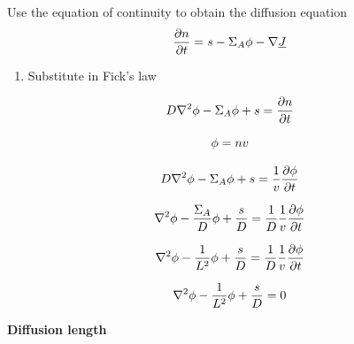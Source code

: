 \documentclass[aspectratio=1610,pdftex,dvipsnames,compress,xcolor={dvipsnames}]{beamer}
\begin{document}
\addtocounter{framenumber}{-3} 
\begin{frame}{Use the equation of continuity to obtain the diffusion equation}
    \begin{equation}
        \small
        \frac{\partial{n}}{\partial{t}} = s - \Sigma_A \phi - \nabla \underline{J}
    \end{equation}

    \begin{enumerate}[series=outerlist,topsep=0pt,itemsep=21pt,leftmargin=*,label=(\arabic*)]
        \item[]Substitute in Fick's law
    \end{enumerate}

    \vspace*{\fill}

    \begin{equation}
        \small
        D \nabla^2 \phi - \Sigma_A \phi + s = \frac{\partial{n}}{\partial{t}}
    \end{equation}

    \vspace*{\fill}

    \begin{equation}
        \small
        \phi = nv
    \end{equation}

    \begin{equation}
        \small
        D \nabla^2 \phi - \Sigma_A \phi + s = \frac{1}{v} \frac{\partial{\phi}}{\partial{t}}
    \end{equation}

    \begin{equation}
        \small
        \nabla^2 \phi - \frac{\Sigma_A}{D} \phi + \frac{s}{D} = \frac{1}{D} \frac{1}{v} \frac{\partial{\phi}}{\partial{t}}
    \end{equation}

    \begin{equation}
        \small
        \nabla^2 \phi - \frac{1}{L^2} \phi + \frac{s}{D} = \frac{1}{D} \frac{1}{v} \frac{\partial{\phi}}{\partial{t}}
    \end{equation}

    \begin{equation}
        \small
        \nabla^2 \phi - \frac{1}{L^2} \phi + \frac{s}{D} = 0
    \end{equation}
\end{frame}


\begin{frame}[plain]{}
    \centering\LARGE\textbf{Diffusion length}
\end{frame}
\end{document}
